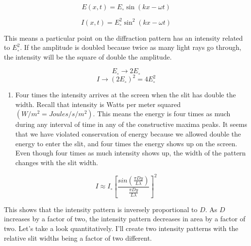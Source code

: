 \documentclass[11pt]{article}
\providecommand{\tightlist}{%
      \setlength{\itemsep}{0pt}\setlength{\parskip}{0pt}}
\begin{document}
\[E(x, t) = E_{\circ} \sin\left(kx-\omega t\right)\]

\[I(x, t) = E_{\circ}^2 \sin^2\left(kx-\omega t\right)\]

This means a particular point on the diffraction pattern has an
intensity related to \(E_{\circ}^2\). If the amplitude is doubled
because twice as many light rays go through, the intensity will be the
square of double the amplitude.

\[E_{\circ} \to 2E_{\circ}\]
\[I \to \left(2E_{\circ}\right)^2 = 4E_{\circ}^2\]

\begin{enumerate}
\def\labelenumi{(\alph{enumi})}
\setcounter{enumi}{1}
\tightlist
\item
  Four times the intensity arrives at the screen when the slit has
  double the width. Recall that intensity is Watts per meter squared
  \(\left(W/m^2 = Joules/s/m^2\right)\). This means the energy is four
  times as much during any interval of time in any of the constructive
  maxima peaks. It seems that we have violated conservation of energy
  because we allowed double the energy to enter the slit, and four times
  the energy shows up on the screen. Even though four times as much
  intensity shows up, the width of the pattern changes with the slit
  width.
\end{enumerate}

\[I \approx I_{\circ}\left[\frac{sin\left(\frac{\pi D y}{L\lambda}\right)}{\frac{\pi D y}{L\lambda}}\right]^2\]

This shows that the intensity pattern is inversely proportional to
\(D\). As \(D\) increases by a factor of two, the intensity pattern
decreases in area by a factor of two. Let's take a look quantitatively.
I'll create two intensity patterns with the relative slit widths being a
factor of two different.
\end{document}
